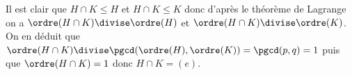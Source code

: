Il est clair que $H\cap K\leqslant H$ et $H\cap K\leqslant K$ donc d'après le
théorème de Lagrange on a $\ordre(H\cap K)\divise\ordre(H)$ et 
$\ordre(H\cap K)\divise\ordre(K)$. On en déduit que 
$\ordre(H\cap K)\divise \pgcd(\ordre(H),\ordre(K)) = \pgcd(p,q)=1$ 
puis que $\ordre(H\cap K) = 1$ donc $H\cap K=(e)$.
